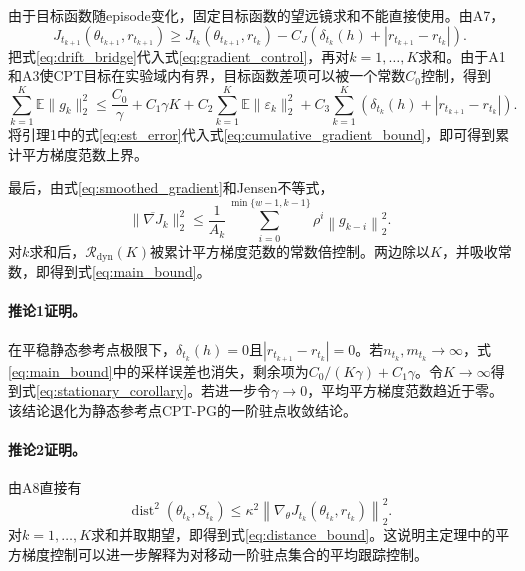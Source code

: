 \documentclass{sufethesismas}
\begin{document}
由于目标函数随episode变化，固定目标函数的望远镜求和不能直接使用。由A7，
\begin{equation}
\label{eq:drift_bridge}
J_{t_{k+1}}(\theta_{t_{k+1}},r_{t_{k+1}})
\ge
J_{t_k}(\theta_{t_{k+1}},r_{t_k})
-
C_J
\left(
\delta_{t_k}(h)+|r_{t_{k+1}}-r_{t_k}|
\right).
\end{equation}
把式\eqref{eq:drift_bridge}代入式\eqref{eq:gradient_control}，再对$k=1,\dots,K$求和。由于A1和A3使CPT目标在实验域内有界，目标函数差项可以被一个常数$C_0$控制，得到
\begin{equation}
\label{eq:cumulative_gradient_bound}
\sum_{k=1}^{K}
\mathbb{E}\|g_k\|_2^2
\le
\frac{C_0}{\gamma}
+
C_1\gamma K
+
C_2
\sum_{k=1}^{K}
\mathbb{E}\|\varepsilon_k\|_2^2
+
C_3
\sum_{k=1}^{K}
\left(
\delta_{t_k}(h)+|r_{t_{k+1}}-r_{t_k}|
\right).
\end{equation}
将引理1中的式\eqref{eq:est_error}代入式\eqref{eq:cumulative_gradient_bound}，即可得到累计平方梯度范数上界。

最后，由式\eqref{eq:smoothed_gradient}和Jensen不等式，
\begin{equation}
\label{eq:smooth_jensen}
\|\overline{\nabla J}_k\|_2^2
\le
\frac{1}{A_k}
\sum_{i=0}^{\min\{w-1,k-1\}}
\rho^i
\left\|
g_{k-i}
\right\|_2^2.
\end{equation}
对$k$求和后，$\mathcal{R}_{\mathrm{dyn}}(K)$被累计平方梯度范数的常数倍控制。两边除以$K$，并吸收常数，即得到式\eqref{eq:main_bound}。

\paragraph{推论1证明。}
在平稳静态参考点极限下，$\delta_{t_k}(h)=0$且$|r_{t_{k+1}}-r_{t_k}|=0$。若$n_{t_k},m_{t_k}\to\infty$，式\eqref{eq:main_bound}中的采样误差也消失，剩余项为$C_0/(K\gamma)+C_1\gamma$。令$K\to\infty$得到式\eqref{eq:stationary_corollary}。若进一步令$\gamma\to0$，平均平方梯度范数趋近于零。该结论退化为静态参考点CPT-PG的一阶驻点收敛结论。

\paragraph{推论2证明。}
由A8直接有
\begin{equation*}
\operatorname{dist}^2(\theta_{t_k},S_{t_k})
\le
\kappa^2
\left\|
\nabla_\theta J_{t_k}(\theta_{t_k},r_{t_k})
\right\|_2^2.
\end{equation*}
对$k=1,\dots,K$求和并取期望，即得到式\eqref{eq:distance_bound}。这说明主定理中的平方梯度控制可以进一步解释为对移动一阶驻点集合的平均跟踪控制。
\end{document}
